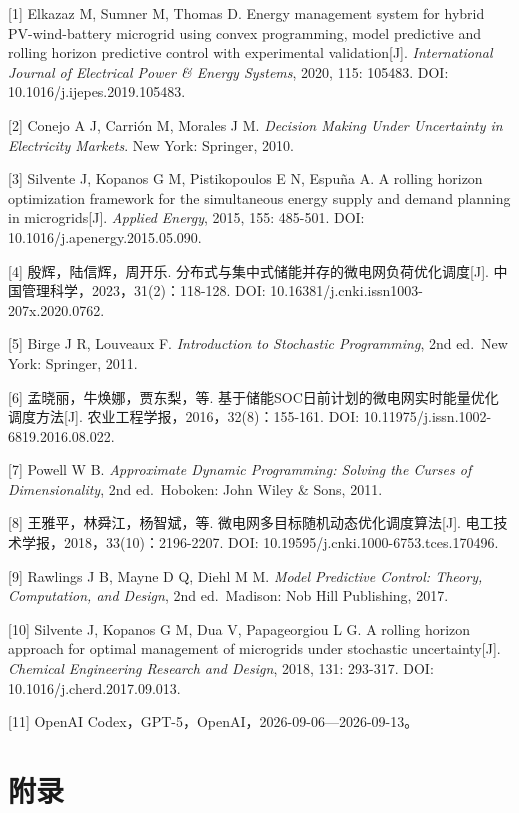 \documentclass[zihao=-4,a4paper,UTF8,fontset=none]{ctexart}
\begin{document}
{[}1{]} Elkazaz M, Sumner M, Thomas D. Energy management system for hybrid PV-wind-battery microgrid using convex programming, model predictive and rolling horizon predictive control with experimental validation{[}J{]}. \emph{International Journal of Electrical Power \& Energy Systems}, 2020, 115: 105483. DOI: 10.1016/j.ijepes.2019.105483.

{[}2{]} Conejo A J, Carrión M, Morales J M. \emph{Decision Making Under Uncertainty in Electricity Markets}. New York: Springer, 2010.

{[}3{]} Silvente J, Kopanos G M, Pistikopoulos E N, Espuña A. A rolling horizon optimization framework for the simultaneous energy supply and demand planning in microgrids{[}J{]}. \emph{Applied Energy}, 2015, 155: 485-501. DOI: 10.1016/j.apenergy.2015.05.090.

{[}4{]} 殷辉，陆信辉，周开乐. 分布式与集中式储能并存的微电网负荷优化调度{[}J{]}. 中国管理科学，2023，31(2)：118-128. DOI: 10.16381/j.cnki.issn1003-207x.2020.0762.

{[}5{]} Birge J R, Louveaux F. \emph{Introduction to Stochastic Programming}, 2nd ed.~New York: Springer, 2011.

{[}6{]} 孟晓丽，牛焕娜，贾东梨，等. 基于储能SOC日前计划的微电网实时能量优化调度方法{[}J{]}. 农业工程学报，2016，32(8)：155-161. DOI: 10.11975/j.issn.1002-6819.2016.08.022.

{[}7{]} Powell W B. \emph{Approximate Dynamic Programming: Solving the Curses of Dimensionality}, 2nd ed.~Hoboken: John Wiley \& Sons, 2011.

{[}8{]} 王雅平，林舜江，杨智斌，等. 微电网多目标随机动态优化调度算法{[}J{]}. 电工技术学报，2018，33(10)：2196-2207. DOI: 10.19595/j.cnki.1000-6753.tces.170496.

{[}9{]} Rawlings J B, Mayne D Q, Diehl M M. \emph{Model Predictive Control: Theory, Computation, and Design}, 2nd ed.~Madison: Nob Hill Publishing, 2017.

{[}10{]} Silvente J, Kopanos G M, Dua V, Papageorgiou L G. A rolling horizon approach for optimal management of microgrids under stochastic uncertainty{[}J{]}. \emph{Chemical Engineering Research and Design}, 2018, 131: 293-317. DOI: 10.1016/j.cherd.2017.09.013.

{[}11{]} OpenAI Codex，GPT-5，OpenAI，2026-09-06---2026-09-13。

\clearpage\appendix\section*{附录}
\end{document}
